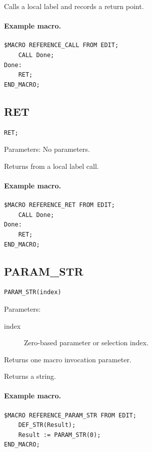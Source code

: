 \documentclass[a4paper,10pt,twoside,openany]{book}
\begin{document}
Calls a local label and records a return point.

\paragraph{Example macro.}
\begin{verbatim}
$MACRO REFERENCE_CALL FROM EDIT;
    CALL Done;
Done:
    RET;
END_MACRO;
\end{verbatim}

\label{prim:keyword-ret}
\subsection*{RET}
\begin{verbatim}
RET;
\end{verbatim}
Parameters: No parameters.

Returns from a local label call.

\paragraph{Example macro.}
\begin{verbatim}
$MACRO REFERENCE_RET FROM EDIT;
    CALL Done;
Done:
    RET;
END_MACRO;
\end{verbatim}

\label{prim:intrinsic-param-str}
\subsection*{PARAM\_STR}
\begin{verbatim}
PARAM_STR(index)
\end{verbatim}
Parameters:
\begin{description}
\item[index] Zero-based parameter or selection index.
\end{description}

Returns one macro invocation parameter.

Returns a string.

\paragraph{Example macro.}
\begin{verbatim}
$MACRO REFERENCE_PARAM_STR FROM EDIT;
    DEF_STR(Result);
    Result := PARAM_STR(0);
END_MACRO;
\end{verbatim}
\end{document}
